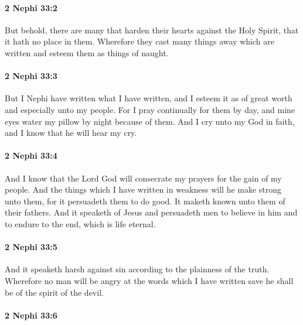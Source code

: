 		\paragraph{2 Nephi 33:2} %
			\label{2NEPHI-33-2}

			But behold, there are many that harden their hearts against the Holy Spirit,
			that it hath no place in them.
			Wherefore they cast many things away which are written
			and esteem them as things of naught.

		\paragraph{2 Nephi 33:3} %
			\label{2NEPHI-33-3}

			But I Nephi have written what I have written,
			and I esteem it as of great worth and especially unto my people.
			For I pray continually for them by day,
			and mine eyes water my pillow by night because of them.
			And I cry unto my God in faith,
			and I know that he will hear my cry.

		\paragraph{2 Nephi 33:4} %
			\label{2NEPHI-33-4}

			And I know that the Lord God will consecrate my prayers
			for the gain of my people.
			And the things which I have written in weakness
			will he make strong unto them,
			for it persuadeth them to do good.
			It maketh known unto them of their fathers.
			And it speaketh of Jesus and persuadeth men
			to believe in him and to endure to the end, which is life eternal.

		\paragraph{2 Nephi 33:5} %
			\label{2NEPHI-33-5}

			And it speaketh harsh against sin according to the plainness of the truth.
			Wherefore no man will be angry at the words which I have written
			save he shall be of the spirit of the devil.

		\paragraph{2 Nephi 33:6} %
			\label{2NEPHI-33-6}

